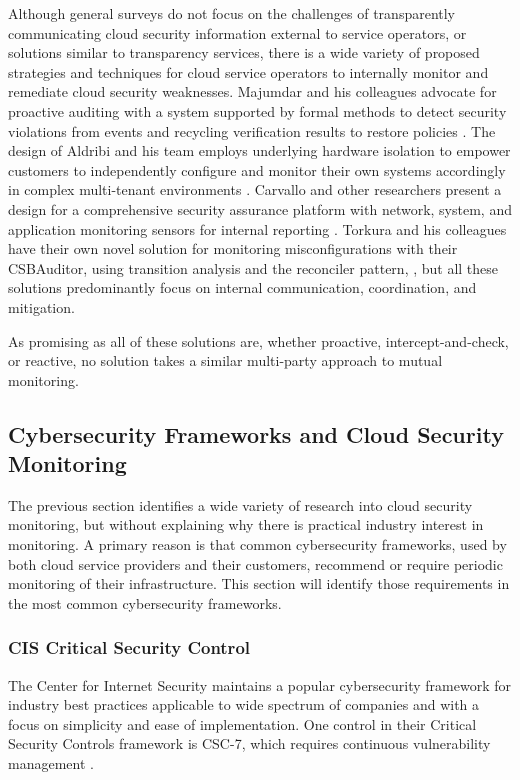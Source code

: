 \documentclass{jdf}
\begin{document}
Although general surveys do not focus on the challenges of transparently communicating cloud security information external to service operators, or solutions similar to transparency services, there is a wide variety of proposed strategies and techniques for cloud service operators to internally monitor and remediate cloud security weaknesses. Majumdar and his colleagues advocate for proactive auditing with a system supported by formal methods to detect security violations from events and recycling verification results to restore policies \citeyear[p.~2518]{majumdar22}. The design of Aldribi and his team employs underlying hardware isolation to empower customers to independently configure and monitor their own systems accordingly in complex multi-tenant environments \citeyear{aldribi15}. Carvallo and other researchers present a design for a comprehensive security assurance platform with network, system, and application monitoring sensors for internal reporting \citeyear{carvallo17}. Torkura and his colleagues have their own novel solution for monitoring misconfigurations with their CSBAuditor, using transition analysis and the reconciler pattern, \citeyear{torkura21}, but all these solutions predominantly focus on internal communication, coordination, and mitigation.

As promising as all of these solutions are, whether proactive, intercept-and-check, or reactive, no solution takes a similar multi-party approach to mutual monitoring.

\subsection{Cybersecurity Frameworks and Cloud Security Monitoring}

The previous section identifies a wide variety of research into cloud security monitoring, but without explaining why there is practical industry interest in monitoring. A primary reason is that common cybersecurity frameworks, used by both cloud service providers and their customers, recommend or require periodic monitoring of their infrastructure. This section will identify those requirements in the most common cybersecurity frameworks.

\subsubsection{CIS Critical Security Control}

The Center for Internet Security maintains a popular cybersecurity framework for industry best practices applicable to wide spectrum of companies and with a focus on simplicity and ease of implementation. One control in their Critical Security Controls framework is CSC-7, which requires continuous vulnerability management \citeyear{csc18}.
\end{document}
